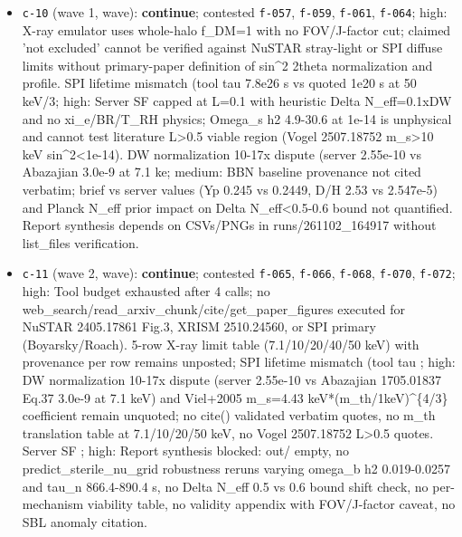 \documentclass[11pt,a4paper]{article}
\begin{document}
\begin{itemize}
  \item \texttt{c-10} (wave 1, wave): \textbf{continue}; contested \texttt{f-057}, \texttt{f-059}, \texttt{f-061}, \texttt{f-064}; high: X-ray emulator uses whole-halo f\_DM=1 with no FOV/J-factor cut; claimed 'not excluded' cannot be verified against NuSTAR stray-light or SPI diffuse limits without primary-paper definition of sin\textasciicircum{}2 2theta normalization and profile. SPI lifetime mismatch (tool tau 7.8e26 s vs quoted 1e20 s at 50 keV/3; high: Server SF capped at L=0.1 with heuristic Delta N\_eff=0.1xDW and no xi\_e/BR/T\_RH physics; Omega\_s h2 4.9-30.6 at 1e-14 is unphysical and cannot test literature L\textgreater{}0.5 viable region (Vogel 2507.18752 m\_s\textgreater{}10 keV sin\textasciicircum{}2\textless{}1e-14). DW normalization 10-17x dispute (server 2.55e-10 vs Abazajian 3.0e-9 at 7.1 ke; medium: BBN baseline provenance not cited verbatim; brief vs server values (Yp 0.245 vs 0.2449, D/H 2.53 vs 2.547e-5) and Planck N\_eff prior impact on Delta N\_eff\textless{}0.5-0.6 bound not quantified. Report synthesis depends on CSVs/PNGs in runs/261102\_164917 without list\_files verification.
  \item \texttt{c-11} (wave 2, wave): \textbf{continue}; contested \texttt{f-065}, \texttt{f-066}, \texttt{f-068}, \texttt{f-070}, \texttt{f-072}; high: Tool budget exhausted after 4 calls; no web\_search/read\_arxiv\_chunk/cite/get\_paper\_figures executed for NuSTAR 2405.17861 Fig.3, XRISM 2510.24560, or SPI primary (Boyarsky/Roach). 5-row X-ray limit table (7.1/10/20/40/50 keV) with provenance per row remains unposted; SPI lifetime mismatch (tool tau ; high: DW normalization 10-17x dispute (server 2.55e-10 vs Abazajian 1705.01837 Eq.37 3.0e-9 at 7.1 keV) and Viel+2005 m\_s=4.43 keV*(m\_th/1keV)\textasciicircum{}\{4/3\} coefficient remain unquoted; no cite() validated verbatim quotes, no m\_th translation table at 7.1/10/20/50 keV, no Vogel 2507.18752 L\textgreater{}0.5 quotes. Server SF ; high: Report synthesis blocked: out/ empty, no predict\_sterile\_nu\_grid robustness reruns varying omega\_b h2 0.019-0.0257 and tau\_n 866.4-890.4 s, no Delta N\_eff 0.5 vs 0.6 bound shift check, no per-mechanism viability table, no validity appendix with FOV/J-factor caveat, no SBL anomaly citation.

\end{itemize}
\end{document}
